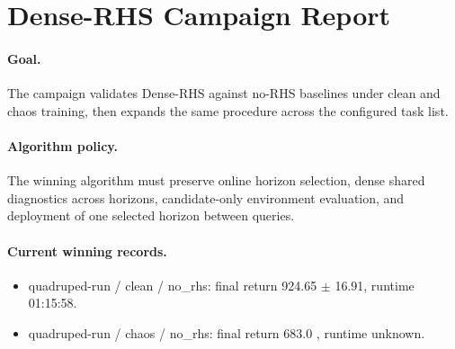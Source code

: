 \section{Dense-RHS Campaign Report}

\paragraph{Goal.}
The campaign validates Dense-RHS against no-RHS baselines under clean and chaos training, then expands the same procedure across the configured task list.

\paragraph{Algorithm policy.}
The winning algorithm must preserve online horizon selection, dense shared diagnostics across horizons, candidate-only environment evaluation, and deployment of one selected horizon between queries.

\paragraph{Current winning records.}
\begin{itemize}
\item quadruped-run / clean / no\_rhs: final return 924.65 $\pm$ 16.91, runtime 01:15:58.
\item quadruped-run / chaos / no\_rhs: final return 683.0 , runtime unknown.
\end{itemize}

